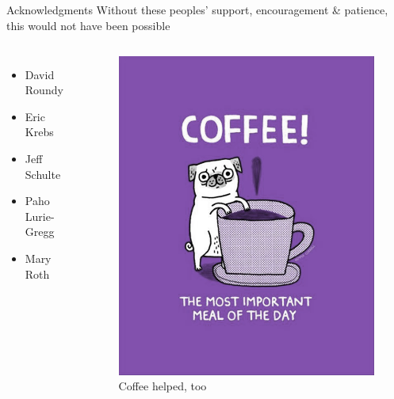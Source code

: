\documentclass[xcolor=dvipsnames]{beamer}
\begin{document}
\subsection{}
\begin{frame}{Acknowledgments}
  Without these peoples' support, encouragement \& patience, this would not have been possible
  \begin{columns}[t]
  \begin{itemize}
    \item David Roundy
    \item Eric Krebs
    \item Jeff Schulte
    \item Paho Lurie-Gregg
    \item Mary Roth
  \end{itemize}
  \begin{figure}
    \centering
    \includegraphics[width=0.9\columnwidth]{figs/coffee}
    \caption{Coffee helped, too}
  \end{figure}
  \end{columns}
\end{frame}
\end{document}
